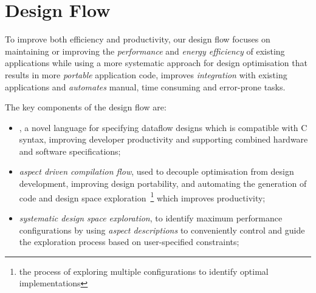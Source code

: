 \section{Design Flow}
\label{sec:design-flow}

To improve both efficiency and productivity, our design flow focuses
on maintaining or improving the \emph{performance} and \emph{energy
  efficiency} of existing applications while using a more systematic
approach for design optimisation that results in more \emph{portable}
application code, improves \emph{integration} with existing
applications and \emph{automates} manual, time consuming and
error-prone tasks.

\begin{comment}
Our design flow aims to improve both \emph{efficiency} (in terms of
performance and energy consumption) and \emph{productivity}. The
former is crucial to High Performance Computing, the latter helps
reduce development cost and time and is a well-known issue with
existing FPGA based acceleration solutions \cite{jones2010gpu}. To
achieve this we focus on maintaining or improving the
\emph{performance} and \emph{energy efficiency} of existing
applications while using a more systematic approach for design
optimisation that results in more \emph{portable} application code,
improves \emph{integration} with existing applications and
\emph{automates} manual, time consuming and error-prone tasks.
\end{comment}

The key components of the design flow are:
\begin{itemize}
\item \emph{\FAST{}}, a novel language for specifying dataflow designs
  which is compatible with C syntax, improving developer productivity
  and supporting combined hardware and software specifications;

\item \emph{aspect driven compilation flow}, used to decouple
  optimisation from design development, improving design portability,
  and automating the generation of code and design space
  exploration~\footnote{the process of exploring multiple
    configurations to identify optimal implementations} which improves
  productivity;

\item \emph{systematic design space exploration}, to identify maximum
  performance configurations by using \emph{aspect descriptions} to
  conveniently control and guide the exploration process based on
  user-specified constraints;
\end{itemize}

